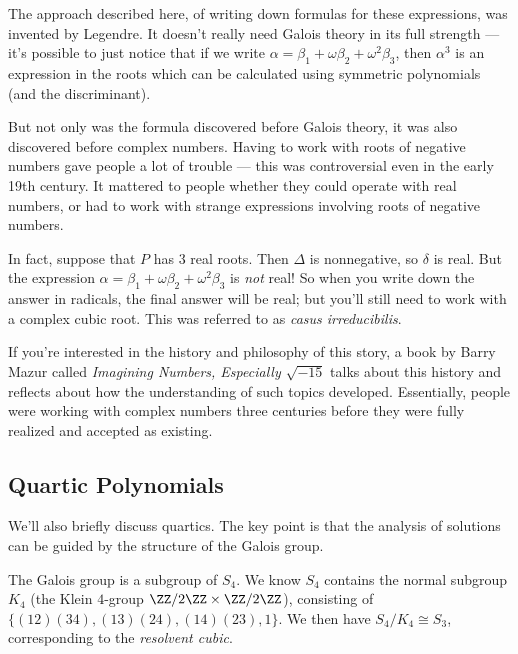 \begin{ans}
    The approach described here, of writing down formulas for these expressions, was invented by Legendre. It doesn't really need Galois theory in its full strength --- it's possible to just notice that if we write $\alpha = \beta_1 + \omega \beta_2 + \omega^2\beta_3$, then $\alpha^3$ is an expression in the roots which can be calculated using symmetric polynomials (and the discriminant). 
    
    But not only was the formula discovered before Galois theory, it was also discovered before complex numbers. Having to work with roots of negative numbers gave people a lot of trouble --- this was controversial even in the early 19th century. It mattered to people whether they could operate with real numbers, or had to work with strange expressions involving roots of negative numbers. 
    
    In fact, suppose that $P$ has $3$ real roots. Then $\Delta$ is nonnegative, so $\delta$ is real. But the expression $\alpha = \beta_1 + \omega \beta_2 + \omega^2\beta_3$ is \emph{not} real! So when you write down the answer in radicals, the final answer will be real; but you'll still need to work with a complex cubic root. This was referred to as \emph{casus irreducibilis}. 
    
    If you're interested in the history and philosophy of this story, a book by Barry Mazur called \emph{Imagining Numbers, Especially $\sqrt{-15}$} talks about this history and reflects about how the understanding of such topics developed. Essentially, people were working with complex numbers three centuries before they were fully realized and accepted as existing.
\end{ans}

\subsection{Quartic Polynomials}

We'll also briefly discuss quartics. The key point is that the analysis of solutions can be guided by the structure of the Galois group. 

The Galois group is a subgroup of $S_4$. We know $S_4$ contains the normal subgroup $K_4$ (the Klein $4$-group $\ZZ/2\ZZ \times \ZZ/2\ZZ$), consisting of $\{(12)(34), (13)(24), (14)(23), 1\}$. We then have $S_4/K_4 \cong S_3$, corresponding to the \emph{resolvent cubic}. 

